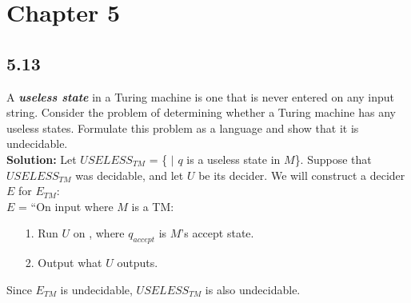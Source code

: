\section{Chapter 5}

\subsection*{5.13} A \emph{\textbf{useless state}} in a Turing machine is one that is never entered on any input string. Consider the problem of determining whether a Turing machine has any useless states. Formulate this problem as a language and show that it is undecidable.
\\
\textbf{Solution:} Let $USELESS_{TM}$ = \{ $|$ $q$ is a useless state in $M$\}. Suppose that $USELESS_{TM}$ was decidable, and let $U$ be its decider. We will construct a decider $E$ for $E_{TM}$:
\\
$E$ = ``On input  where $M$ is a TM:
\begin{enumerate}
\itemsep0em
\item[1.]Run $U$ on , where $q_{accept}$ is $M$'s accept state.
\item[2.]Output what $U$ outputs.
\end{enumerate}
Since $E_{TM}$ is undecidable, $USELESS_{TM}$ is also undecidable.

